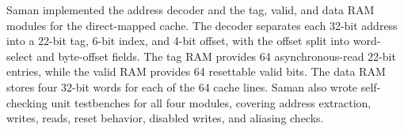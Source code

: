 Saman implemented the address decoder and the tag, valid, and data RAM modules for the direct-mapped cache. The decoder separates each 32-bit address into a 22-bit tag, 6-bit index, and 4-bit offset, with the offset split into word-select and byte-offset fields. The tag RAM provides 64 asynchronous-read 22-bit entries, while the valid RAM provides 64 resettable valid bits. The data RAM stores four 32-bit words for each of the 64 cache lines. Saman also wrote self-checking unit testbenches for all four modules, covering address extraction, writes, reads, reset behavior, disabled writes, and aliasing checks.
